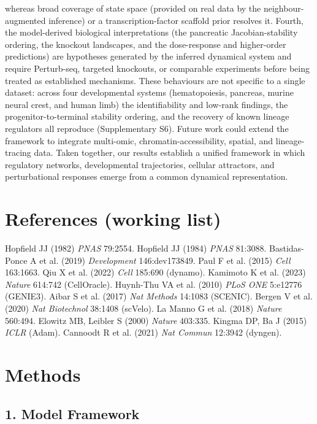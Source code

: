 \documentclass[11pt]{article}
\begin{document}
whereas broad coverage of state space (provided on real data by the neighbour-augmented inference) or a transcription-factor scaffold prior resolves it. Fourth, the model-derived biological interpretations (the pancreatic Jacobian-stability ordering, the knockout landscapes, and the dose-response and higher-order predictions) are hypotheses generated by the inferred dynamical system and require Perturb-seq, targeted knockouts, or comparable experiments before being treated as established mechanisms. These behaviours are not specific to a single dataset: across four developmental systems (hematopoiesis, pancreas, murine neural crest, and human limb) the identifiability and low-rank findings, the progenitor-to-terminal stability ordering, and the recovery of known lineage regulators all reproduce (Supplementary S6). Future work could extend the framework to integrate multi-omic, chromatin-accessibility, spatial, and lineage-tracing data. Taken together, our results establish a unified framework in which regulatory networks, developmental trajectories, cellular attractors, and perturbational responses emerge from a common dynamical representation.

\section*{References (working list)}
\small
Hopfield JJ (1982) \textit{PNAS} 79:2554. Hopfield JJ (1984) \textit{PNAS} 81:3088.
Bastidas-Ponce A et al. (2019) \textit{Development} 146:dev173849.
Paul F et al. (2015) \textit{Cell} 163:1663.
Qiu X et al. (2022) \textit{Cell} 185:690 (dynamo).
Kamimoto K et al. (2023) \textit{Nature} 614:742 (CellOracle).
Huynh-Thu VA et al. (2010) \textit{PLoS ONE} 5:e12776 (GENIE3).
Aibar S et al. (2017) \textit{Nat Methods} 14:1083 (SCENIC).
Bergen V et al. (2020) \textit{Nat Biotechnol} 38:1408 (scVelo).
La Manno G et al. (2018) \textit{Nature} 560:494.
Elowitz MB, Leibler S (2000) \textit{Nature} 403:335.
Kingma DP, Ba J (2015) \textit{ICLR} (Adam).
Cannoodt R et al. (2021) \textit{Nat Commun} 12:3942 (dyngen).

\clearpage
\section*{Methods}


\subsection*{1. Model Framework}
\end{document}
